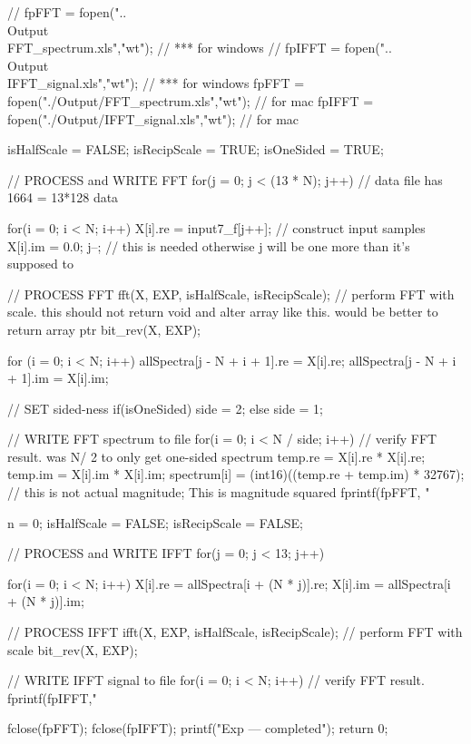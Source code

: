 \documentclass{bannerReport}
\begin{document}
\begin{code}
{	// fpFFT  = fopen("..\\Output\\FFT_spectrum.xls","wt"); // *** for 
	windows
	// fpIFFT = fopen("..\\Output\\IFFT_signal.xls","wt");  // *** for 
	windows
	fpFFT  = fopen("./Output/FFT_spectrum.xls","wt");	// for mac
	fpIFFT = fopen("./Output/IFFT_signal.xls","wt");	// for mac

	isHalfScale = FALSE;
	isRecipScale = TRUE;
	isOneSided = TRUE;

	// PROCESS and WRITE FFT 
	for(j = 0; j < (13 * N); j++)		// data file has 1664 = 13*128 data 
	{
		for(i = 0; i < N; i++) 
		{
			X[i].re = input7_f[j++];	// construct input samples 
			X[i].im = 0.0;        
		}
		j--; // this is needed otherwise j will be one more than it's 
		supposed to

		// PROCESS FFT
		fft(X, EXP, isHalfScale, isRecipScale); // perform FFT with scale. 
		this should not return void and alter array like this. would be 
		better 
		to return array ptr
		bit_rev(X, EXP);

		for (i = 0; i < N; i++)
		{
			allSpectra[j - N + i + 1].re = X[i].re;
			allSpectra[j - N + i + 1].im = X[i].im;
		}
		
		// SET sided-ness
		if(isOneSided)
		{
			side = 2;
		}
		else
		{
			side = 1;
		}
		
		// WRITE FFT spectrum to file
		for(i = 0; i < N / side; i++)			  // verify FFT result. was 
		N/ 2 to only get one-sided spectrum
		{
			temp.re = X[i].re * X[i].re;
			temp.im = X[i].im * X[i].im;        
			spectrum[i] = (int16)((temp.re + temp.im) * 32767); // this is not
				actual magnitude; This is magnitude squared
			fprintf(fpFFT, "%
		}
	}

	n = 0;
	isHalfScale = FALSE;
	isRecipScale = FALSE;

	// PROCESS and WRITE IFFT
	for(j = 0; j < 13; j++)
	{
		for(i = 0; i < N; i++) 
		{
			X[i].re = allSpectra[i + (N * j)].re;
			X[i].im = allSpectra[i + (N * j)].im;
		} 	

		// PROCESS IFFT
		ifft(X, EXP, isHalfScale, isRecipScale); // perform FFT with scale
		bit_rev(X, EXP);

		// WRITE IFFT signal to file
		for(i = 0; i < N; i++)			  // verify FFT result.
		{
			fprintf(fpIFFT,"%
		}
	}

	fclose(fpFFT);
	fclose(fpIFFT);
	printf("Exp --- completed\n");
	return 0;
}


		\end{code}
\end{document}
